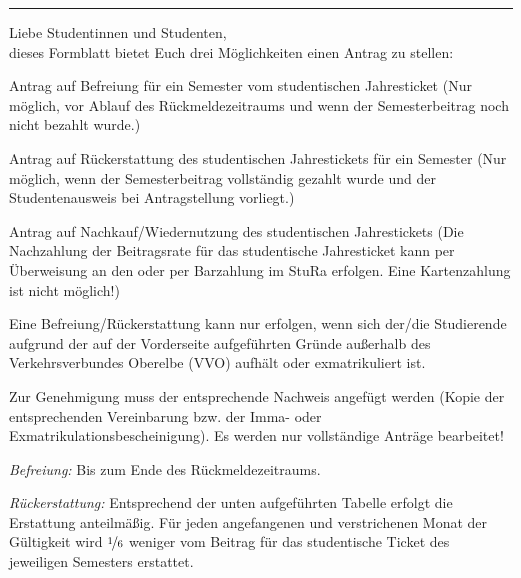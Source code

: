 \documentclass[%
	ngerman,	%
	parskip=half,
	paper=a4,%
	pagesize=auto	%
	]{scrartcl}
\begin{document}
\vfill

\hrule
Liebe Studentinnen und Studenten,\\
dieses Formblatt bietet Euch drei Möglichkeiten einen Antrag zu stellen:
\footnotesize
\begin{compactenum}
\item	Antrag auf Befreiung für ein Semester vom studentischen Jahresticket
	(Nur möglich, vor Ablauf des Rückmeldezeitraums und wenn der
	Semesterbeitrag noch nicht bezahlt wurde.)

\item	Antrag auf Rückerstattung des studentischen Jahrestickets für ein
	Semester (Nur möglich, wenn der Semesterbeitrag vollständig gezahlt
	wurde und der Studentenausweis bei Antragstellung vorliegt.)

\item	Antrag auf Nachkauf/Wiedernutzung des studentischen Jahrestickets (Die
	Nachzahlung der Beitragsrate für das studentische Jahresticket kann per
	Überweisung an den oder per Barzahlung im StuRa erfolgen. Eine
	Kartenzahlung ist nicht möglich!)
\end{compactenum}

Eine Befreiung/Rückerstattung kann nur erfolgen, wenn sich der/die Studierende
aufgrund der auf der Vorderseite aufgeführten Gründe außerhalb des
Verkehrsverbundes Oberelbe (VVO) aufhält oder exmatrikuliert ist.

Zur Genehmigung muss der entsprechende Nachweis angefügt werden (Kopie der
entsprechenden Vereinbarung bzw. der Imma- oder Exmatrikulationsbescheinigung).
Es werden nur vollständige Anträge bearbeitet!

\begin{compactitem}
\item[\emph{Befreiung:}]
	Bis zum Ende des Rückmeldezeitraums.
\item[\emph{Rückerstattung:}]
	Entsprechend der unten aufgeführten Tabelle erfolgt die Erstattung
	anteilmäßig. Für jeden angefangenen und verstrichenen Monat der
	Gültigkeit wird $\nicefrac{1}{6}$ weniger vom Beitrag für das
	studentische Ticket des jeweiligen Semesters erstattet.
\end{compactitem}
\end{document}
